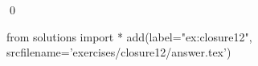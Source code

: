 
\begin{ex} 
  \label{ex:closure12}
  
  \qed
\end{ex} 
\begin{python0}
from solutions import *
add(label="ex:closure12",
    srcfilename='exercises/closure12/answer.tex') 
\end{python0}
